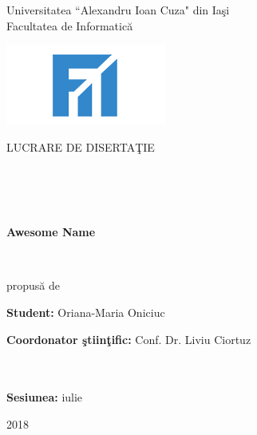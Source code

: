 \documentclass[11pt, a4papper]{report}
\theoremstyle{plain}
\theoremstyle{definition}
\theoremstyle{definition}
\theoremstyle{proposition}
\begin{document}
\begin{titlepage}

\begin{center}
\begin{large}
Universitatea ``Alexandru Ioan Cuza" din Iaşi\\
Facultatea de Informatică\\
\end{large}
\end{center}

\vspace{50mm}

\begin{center}
\includegraphics{fii.png}
\end{center}
 
\vspace{15mm}

\begin{center}
\begin{Large}
LUCRARE DE DISERTAŢIE
\end{Large}
\\
\
\\
\
\

\begin{Huge}
\textbf{Awesome Name}
\end{Huge}

\

propusă de

\end{center}

\vspace{30mm}

\textbf{Student:} Oriana-Maria Oniciuc

\textbf{Coordonator ştiinţific:} Conf. Dr. Liviu Ciortuz
\\
\
\\
\


\vfill

\begin{center}
\textbf{Sesiunea:} iulie

2018
\end{center}

\end{titlepage}
\newpage
\end{document}
